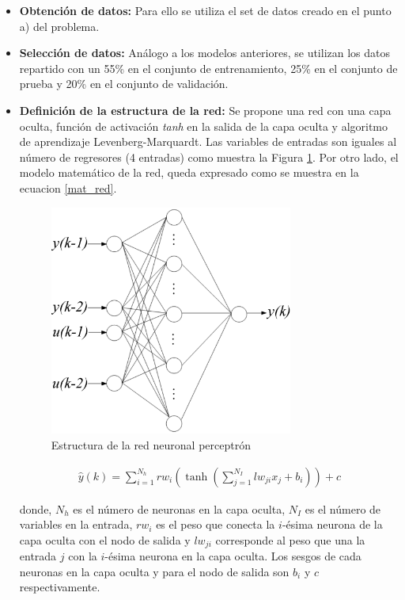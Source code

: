 \documentclass[12pt]{article}
\begin{document}
\begin{itemize}
	\item \textbf{Obtención de datos:} Para ello se utiliza el set de datos creado en el punto a) del problema.
	\item \textbf{Selección de datos:} Análogo a los modelos anteriores, se utilizan los datos repartido con un 55\% en el conjunto de entrenamiento, 25\% en el conjunto de prueba y 20\% en el conjunto de validación.
	\item \textbf{Definición de la estructura de la red:} Se propone una red con una capa oculta, función de activación \textit{tanh} en la salida de la capa oculta y algoritmo de aprendizaje Levenberg-Marquardt. Las variables de entradas son iguales al número de regresores (4 entradas) como muestra la Figura \ref{estred}. Por otro lado, el modelo matemático de la red, queda expresado como se muestra en la ecuacion \ref{mat_red}.
	\begin{figure}
		\centering
		 \includegraphics[width=8cm]{imag/redes/estructura.eps}
		\caption{Estructura de la red neuronal perceptrón}
		\label{estred}
	\end{figure}
	\begin{align}
	\hat{y}(k) = \sum_{i=1}^{N_h} rw_i \left( \tanh\left(\sum_{j=1}^{N_I} lw_{ji} x_j + b_i\right)\right) + c
	\label{mat_red}
	\end{align}
	
	donde, $N_h$ es el número de neuronas en la capa oculta, $N_I$ es el número de variables en la entrada, $rw_i$ es el peso que conecta la $i$-ésima neurona de la capa oculta con el nodo de salida y $lw_{ji}$ corresponde al peso que una la entrada $j$ con la $i$-ésima neurona en la capa oculta. Los sesgos de cada neuronas en la capa oculta y para el nodo de salida son $b_i$ y $c$ respectivamente.
	

\end{itemize}
\end{document}
